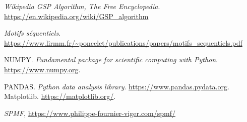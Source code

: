 \documentclass[a4paper,12pt]{article}
\begin{document}
\newpage

\begin{thebibliography}{9}

\textit{Wikipedia GSP Algorithm, The Free Encyclopedia}. \url{https://en.wikipedia.org/wiki/GSP_algorithm}

 \textit{Motifs séquentiels}. \url{https://www.lirmm.fr/~poncelet/publications/papers/motifs_sequentiels.pdf}

NUMPY. \textit{Fundamental package for scientific computing with Python}. \url{https://www.numpy.org}.

PANDAS. \textit{Python data analysis library}. \url{https://www.pandas.pydata.org}.
Matplotlib. \url{https://matplotlib.org/}.

\textit{ SPMF}, \url{https://www.philippe-fournier-viger.com/spmf/}


\end{thebibliography}
\end{document}
